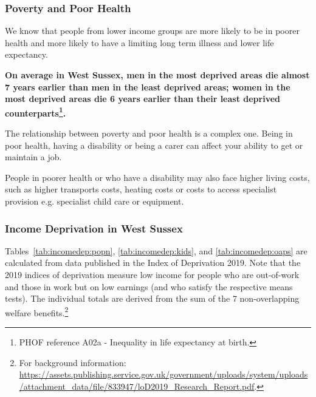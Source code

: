 \subsubsection{Poverty and Poor Health}
We know that people from lower income groups are more likely to be in poorer health and more likely to have a limiting long term illness and lower life expectancy.

{\bf On average in West Sussex, men in the most deprived areas die almost 7 years earlier than men in the least deprived areas; women in the most deprived areas die 6 years earlier than their least deprived counterparts\footnote{PHOF reference A02a - Inequality in life expectancy at birth.}.}

The relationship between poverty and poor health is a complex one. Being in poor health, having a disability or being a carer can affect your ability to get or maintain a job.

People in poorer health or who have a disability may also face higher living costs, such as higher transports costs, heating costs or costs to access specialist provision e.g. specialist child care or equipment.

\subsubsection{Income Deprivation in West Sussex}
Tables~\ref{tab:incomedep:popn}, \ref{tab:incomedep:kids}, and \ref{tab:incomedep:oaps} are calculated from data published in the Index of Deprivation 2019. Note that the 2019 indices of deprivation measure low income for people who are out-of-work and those in work but on low earnings (and who satisfy the respective means tests). The individual totals are derived from the sum of the 7 non-overlapping welfare benefits.\footnote{For background information: \url{https://assets.publishing.service.gov.uk/government/uploads/system/uploads/attachment_data/file/833947/loD2019_Research_Report.pdf}.}

